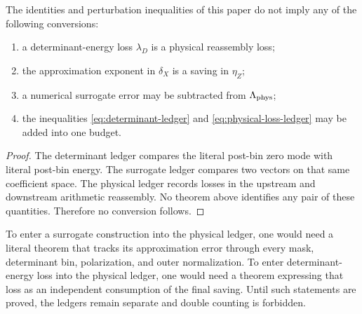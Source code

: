 \begin{proposition}
\label{prop:no-ledger-conversion}
The identities and perturbation inequalities of this paper do not
imply any of the following conversions:
\begin{enumerate}[label=(\roman*),leftmargin=2.2em]
\item a determinant-energy loss \(\lambda_D\) is a physical
reassembly loss;
\item the approximation exponent in \(\delta_X\) is a saving in
\(\eta_Z\);
\item a numerical surrogate error may be subtracted from
\(\Lambda_{\rm phys}\);
\item the inequalities
\eqref{eq:determinant-ledger} and
\eqref{eq:physical-loss-ledger} may be added into one budget.
\end{enumerate}
\end{proposition}

\begin{proof}
The determinant ledger compares the literal post-bin zero mode with
literal post-bin energy.  The surrogate ledger compares two vectors
on that same coefficient space.  The physical ledger records losses
in the upstream and downstream arithmetic reassembly.  No theorem
above identifies any pair of these quantities.  Therefore no
conversion follows.
\end{proof}

\begin{remark}
To enter a surrogate construction into the physical ledger, one
would need a literal theorem that tracks its approximation error
through every mask, determinant bin, polarization, and outer
normalization.  To enter determinant-energy loss into the physical
ledger, one would need a theorem expressing that loss as an
independent consumption of the final saving.  Until such statements
are proved, the ledgers remain separate and double counting is
forbidden.
\end{remark}
